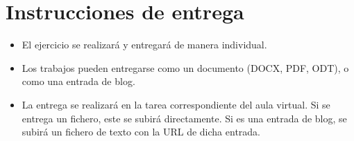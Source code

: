 \documentclass[a4paper]{article}
\begin{document}
\section*{Instrucciones de entrega}
\label{sec:org0000018}
\begin{itemize}
\item El ejercicio se realizará y entregará de manera individual.
\item Los trabajos pueden entregarse como un documento (DOCX, PDF, ODT), o como una entrada de blog.
\item La entrega se realizará en la tarea correspondiente del aula virtual. Si se entrega un fichero, este se subirá directamente. Si es una entrada de blog, se subirá un fichero de texto con la URL de dicha entrada.
\end{itemize}
\end{document}
